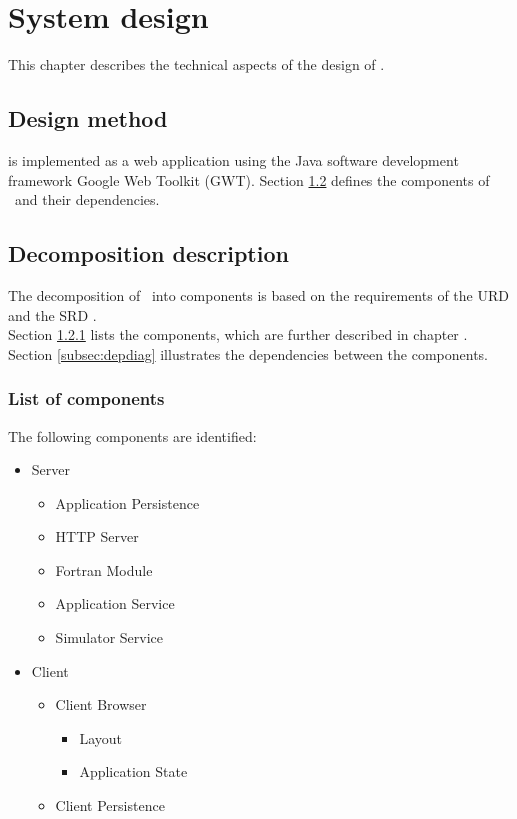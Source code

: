 \chapter{System design}
\label{chap:systdesign}
This chapter describes the technical aspects of the design of \projectname. \\

\section{Design method}
\projectname is implemented as a web application using the Java software development framework Google Web Toolkit (GWT). Section \ref{sec:decompdescr} defines the components of \projectname\ and their dependencies. \\


\section{Decomposition description}
\label{sec:decompdescr}
The decomposition of \projectname\ into components is based on the requirements of the URD \cite{urd} and the SRD \cite{srd}.\\
 Section \ref{subsec:complist} lists the components, which are further described in chapter \label{chap:compdescr}. Section \ref{subsec:depdiag} illustrates the dependencies between the components.

\subsection{List of components}
\label{subsec:complist}
The following components are identiﬁed:\\

\begin{itemize}
\item Server
\begin{itemize}
\item Application Persistence 
\item HTTP Server
\item Fortran Module
\item Application Service
\item Simulator Service
\end{itemize}
\item Client
\begin{itemize}
\item Client Browser
\begin{itemize}
\item Layout
\item Application State
\end{itemize} 
\item Client Persistence
\end{itemize}
\end{itemize}

